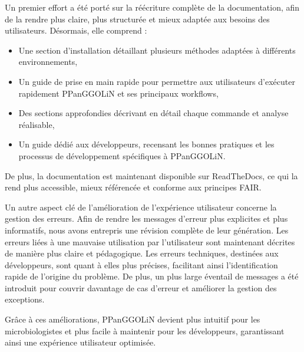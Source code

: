 Un premier effort a été porté sur la réécriture complète de la documentation, afin de la rendre plus claire, plus structurée et mieux adaptée aux besoins des utilisateurs. Désormais, elle comprend :

\begin{itemize}
    \item Une section d’installation détaillant plusieurs méthodes adaptées à différents environnements,
    \item Un guide de prise en main rapide pour permettre aux utilisateurs d’exécuter rapidement PPanGGOLiN et ses principaux workflows,
    \item Des sections approfondies décrivant en détail chaque commande et analyse réalisable,
    \item Un guide dédié aux développeurs, recensant les bonnes pratiques et les processus de développement spécifiques à PPanGGOLiN.
\end{itemize}

De plus, la documentation est maintenant disponible sur ReadTheDocs, ce qui la rend plus accessible, mieux référencée et conforme aux principes FAIR.

\newpage

Un autre aspect clé de l’amélioration de l’expérience utilisateur concerne la gestion des erreurs. Afin de rendre les messages d’erreur plus explicites et plus informatifs, nous avons entrepris une révision complète de leur génération.
Les erreurs liées à une mauvaise utilisation par l’utilisateur sont maintenant décrites de manière plus claire et pédagogique. Les erreurs techniques, destinées aux développeurs, sont quant à elles plus précises, facilitant ainsi l’identification rapide de l’origine du problème. De plus, un plus large éventail de messages a été introduit pour couvrir davantage de cas d’erreur et améliorer la gestion des exceptions.


Grâce à ces améliorations, PPanGGOLiN devient plus intuitif pour les microbiologistes et plus facile à maintenir pour les développeurs, garantissant ainsi une expérience utilisateur optimisée.



